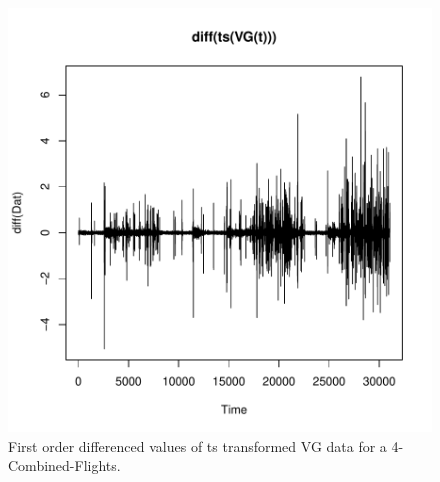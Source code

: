 \documentclass{article}
\begin{document}


\begin{figure}[!h] \begin{center}
\includegraphics{test1-001}
\caption{First order differenced values of ts transformed VG data for a 4-Combined-Flights.}
\label{fig:data-4-3}
\end{center} \end{figure}
\end{document}
